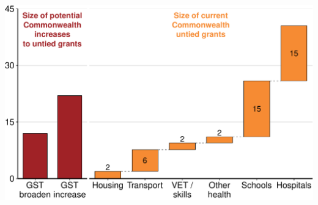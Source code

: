 \documentclass[a4paper,landscape]{article}\usepackage[]{graphicx}\usepackage[]{color}
\newenvironment{knitrout}{}{} %
\begin{document}
\begin{knitrout}
\includegraphics[width=11.000in,height=7.00in]{figure/GST-Figure-10-2} 

\end{knitrout}
\end{document}
